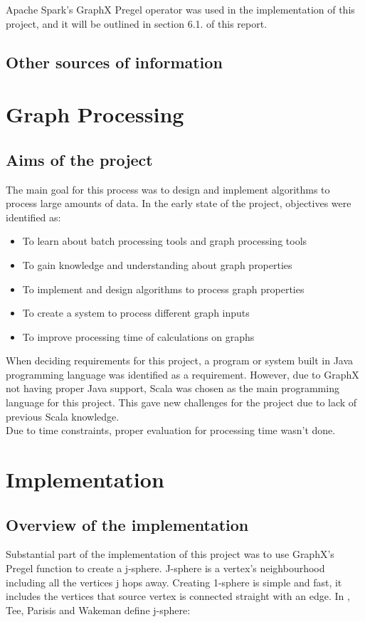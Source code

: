 \documentclass{article}
\theoremstyle{definition}
\begin{document}
Apache Spark's GraphX Pregel operator was used in the implementation of this project, and it will be outlined in section 6.1. of this report. \\

\subsection{Other sources of information}



\section{Graph Processing}




\subsection{Aims of the project}
The main goal for this process was to design and implement algorithms to process large amounts of data. In the early state of the project, objectives were identified as: 
\begin{itemize}
\item To learn about batch processing tools and graph processing tools
\item To gain knowledge and understanding about graph properties
\item To implement and design algorithms to process graph properties
\item To create a system to process different graph inputs
\item To improve processing time of calculations on graphs
\end{itemize}

When deciding requirements for this project, a program or system built in Java programming language was identified as a requirement. However, due to GraphX not having proper Java support, Scala was chosen as the main programming language for this project. This gave new challenges for the project due to lack of previous Scala knowledge. \\

Due to time constraints, proper evaluation for processing time wasn't done.  

\section{Implementation}
\subsection{Overview of the implementation}
Substantial part of the implementation of this project was to use GraphX's Pregel function to create a j-sphere. J-sphere is a vertex's neighbourhood including all the vertices j hops away. Creating 1-sphere is simple and fast, it includes the vertices that source vertex is connected straight with an edge. In \cite{Tee2016b}, Tee, Parisis and Wakeman define j-sphere:
\end{document}
